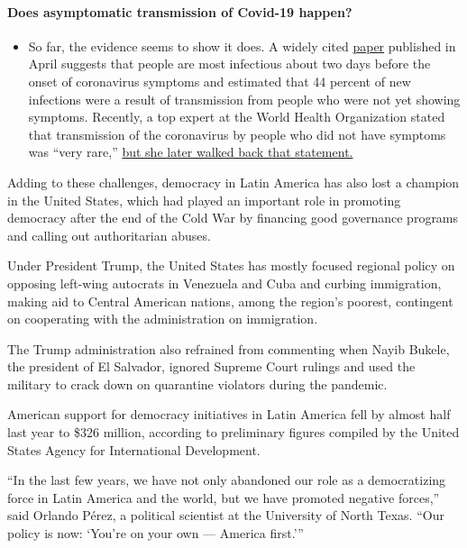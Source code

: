 \begin{itemize}
{  \paragraph{Does asymptomatic transmission of Covid-19
  happen?}\label{does-asymptomatic-transmission-of-covid-19-happen}}

  \begin{itemize}
  \tightlist
  \item
    So far, the evidence seems to show it does. A widely cited
    \href{https://www.nature.com/articles/s41591-020-0869-5}{paper}
    published in April suggests that people are most infectious about
    two days before the onset of coronavirus symptoms and estimated that
    44 percent of new infections were a result of transmission from
    people who were not yet showing symptoms. Recently, a top expert at
    the World Health Organization stated that transmission of the
    coronavirus by people who did not have symptoms was ``very rare,''
    \href{https://www.nytimes3xbfgragh.onion/2020/06/09/world/coronavirus-updates.html?action=click\&pgtype=Article\&state=default\&region=MAIN_CONTENT_3\&context=storylines_faq\#link-1f302e21}{but
    she later walked back that statement.}
  \end{itemize}
\end{itemize}

Adding to these challenges, democracy in Latin America has also lost a
champion in the United States, which had played an important role in
promoting democracy after the end of the Cold War by financing good
governance programs and calling out authoritarian abuses.

Under President Trump, the United States has mostly focused regional
policy on opposing left-wing autocrats in Venezuela and Cuba and curbing
immigration, making aid to Central American nations, among the region's
poorest, contingent on cooperating with the administration on
immigration.

The Trump administration also refrained from commenting when Nayib
Bukele, the president of El Salvador, ignored Supreme Court rulings and
used the military to crack down on quarantine violators during the
pandemic.

American support for democracy initiatives in Latin America fell by
almost half last year to \$326 million, according to preliminary figures
compiled by the United States Agency for International Development.

``In the last few years, we have not only abandoned our role as a
democratizing force in Latin America and the world, but we have promoted
negative forces,'' said Orlando Pérez, a political scientist at the
University of North Texas. ``Our policy is now: `You're on your own ---
America first.'''

